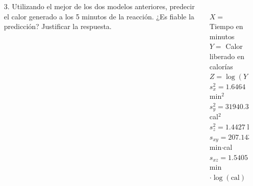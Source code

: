 \documentclass[aspectratio=149,10pt,xcolor=dvipsnames,t]{beamer}
\begin{document}
\begin{frame}
\begin{columns}
\begin{column}[T]{0.65\textwidth}
\begin{enumerate}
\item[3.] Utilizando el mejor de los dos modelos anteriores, predecir el calor generado a los 5 minutos de la reacción. ¿Es
fiable la predicción? Justificar la respuesta. 
\end{enumerate}
\end{column}
\begin{column}[T]{0.35\textwidth}
\\
$X=$ Tiempo en minutos\\
$Y=$ Calor liberado en calorías\\
$Z=\log(Y)$\\
$s_x^2=1.6464$ min$^2$\\
$s_y^2=31940.3344$ cal$^2$\\
$s_z^2=1.4427 \log^2(\mbox{cal})$\\
$s_{xy}=207.1436$ min$\cdot$cal\\
$s_{xz}=1.5405$ min$\cdot\log(\mbox{cal})$
\end{column}
\end{columns}
\end{frame}
\end{document}
